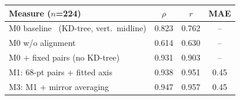 \begin{tabular}{@{}lccc@{}}
\toprule
Measure ($n$=224) & $\rho$ & $r$ & MAE\\
\midrule
M0 baseline~\cite{nashokan_facialasymmetry} (KD-tree, vert.\ midline) & 0.823 & 0.762 & --\\
\quad M0 w/o alignment & 0.614 & 0.630 & --\\
\quad M0 + fixed pairs (no KD-tree) & 0.931 & 0.903 & --\\
M1: 68-pt pairs + fitted axis & 0.938 & 0.951 & 0.45\\
M3: M1 + mirror averaging & 0.947 & 0.957 & 0.45\\
\bottomrule
\end{tabular}
